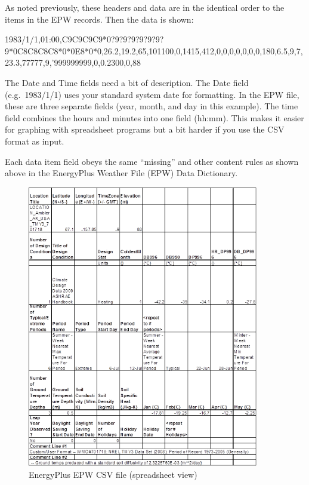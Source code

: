 As noted previously, these headers and data are in the identical order to the items in the EPW records. Then the data is shown:

1983/1/1,01:00,C9C9C9C9*0?9?9?9?9?9?9?9*0C8C8C8C8*0*0E8*0*0,26.2,19.2,65,101100,0,1415,412,0,0,0,0,0,0,0,180,6.5,9,7,23.3,77777,9,'999999999,0,0.2300,0,88

The Date and Time fields need a bit of description. The Date field (e.g.~1983/1/1) uses your standard system date for formatting. In the EPW file, these are three separate fields (year, month, and day in this example). The time field combines the hours and minutes into one field (hh:mm). This makes it easier for graphing with spreadsheet programs but a bit harder if you use the CSV format as input.

Each data item field obeys the same ``missing'' and other content rules as shown above in the EnergyPlus Weather File (EPW) Data Dictionary.

\begin{figure}[hbtp] %
\centering
\includegraphics[width=0.9\textwidth, height=0.9\textheight, keepaspectratio=true]{media/image015.png}
\caption{EnergyPlus EPW CSV file (spreadsheet view) \protect \label{fig:energyplus-epw-csv-file-spreadsheet-view}}
\end{figure}

